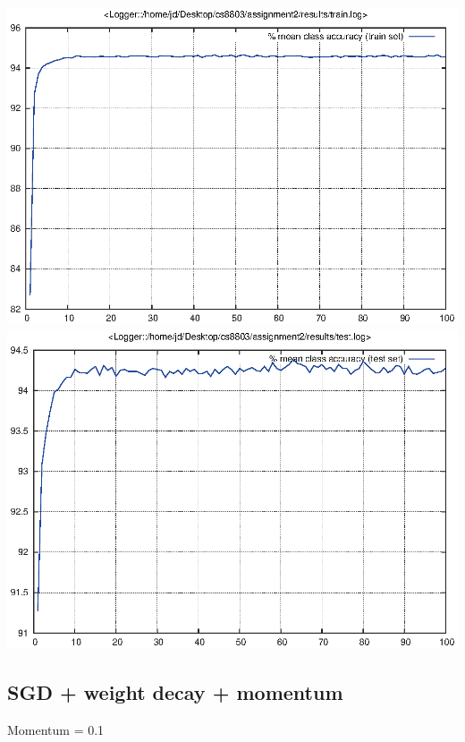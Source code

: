 \documentclass[twoside,12pt]{article}
\newcommand{\imsize}{0.5\linewidth}
\begin{document}
\includegraphics[width=\imsize]{assignment2/results/sgdw_w4_train}
\includegraphics[width=\imsize]{assignment2/results/sgdw_w4_test}

\subsection{SGD + weight decay + momentum}

Momentum = 0.1
\end{document}
